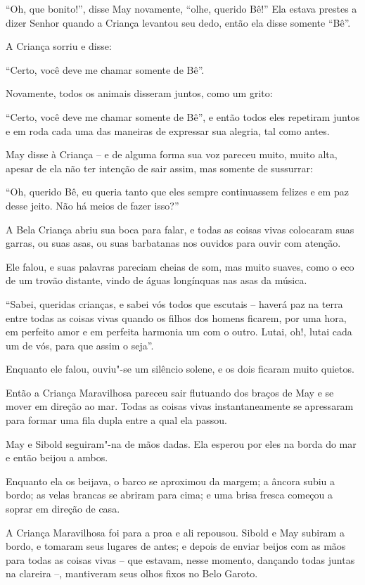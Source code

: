 ``Oh, que bonito!'', disse May novamente, ``olhe, querido Bê!'' Ela
estava prestes a dizer Senhor quando a Criança levantou seu dedo, então
ela disse somente ``Bê''.

A Criança sorriu e disse:

``Certo, você deve me chamar somente de Bê''.

Novamente, todos os animais disseram juntos, como um grito:

``Certo, você deve me chamar somente de Bê'', e então todos eles
repetiram juntos e em roda cada uma das maneiras de expressar sua
alegria, tal como antes.

May disse à Criança -- e de alguma forma sua voz pareceu muito, muito
alta, apesar de ela não ter intenção de sair assim, mas somente de
sussurrar:

``Oh, querido Bê, eu queria tanto que eles sempre continuassem felizes e
em paz desse jeito. Não há meios de fazer isso?''

A Bela Criança abriu sua boca para falar, e todas as coisas vivas
colocaram suas garras, ou suas asas, ou suas barbatanas nos ouvidos para
ouvir com atenção.

Ele falou, e suas palavras pareciam cheias de som, mas muito suaves,
como o eco de um trovão distante, vindo de águas longínquas nas asas da
música.

``Sabei, queridas crianças, e sabei vós todos que escutais -- haverá paz
na terra entre todas as coisas vivas quando os filhos dos homens
ficarem, por uma hora, em perfeito amor e em perfeita harmonia um com o
outro. Lutai, oh!, lutai cada um de vós, para que assim o seja''.

Enquanto ele falou, ouviu"-se um silêncio solene, e os dois ficaram muito
quietos.

Então a Criança Maravilhosa pareceu sair flutuando dos braços de May e
se mover em direção ao mar. Todas as coisas vivas instantaneamente se
apressaram para formar uma fila dupla entre a qual ela passou.

May e Sibold seguiram"-na de mãos dadas. Ela esperou por eles na borda do
mar e então beijou a ambos.

Enquanto ela os beijava, o barco se aproximou da margem; a âncora subiu
a bordo; as velas brancas se abriram para cima; e uma brisa fresca
começou a soprar em direção de casa.

A Criança Maravilhosa foi para a proa e ali repousou. Sibold e May
subiram a bordo, e tomaram seus lugares de antes; e depois de enviar
beijos com as mãos para todas as coisas vivas -- que estavam, nesse
momento, dançando todas juntas na clareira --, mantiveram seus olhos
fixos no Belo Garoto.

